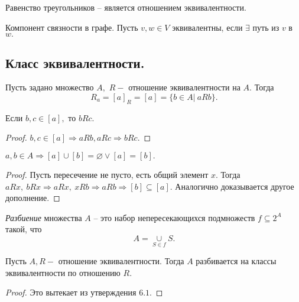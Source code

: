 \begin{example}
    Равенство треугольников -- является отношением эквивалентности.
\end{example}

\begin{example}
    Компонент связности в графе. Пусть $v, w \in V$ эквивалентны, если $\exists$ путь из $v$ в $w.$
\end{example}


\subsection{Класс эквивалентности.}

\begin{definition}
    Пусть задано множество $A,$  $R-$ отношение эквивалентности на $A.$ Тогда 
    $$R_{a} = [a]_{R} = [a] = \{ b \in A | \  a R b\}.$$
\end{definition}

\begin{proposition}
    Если $b, c \in [a],$ то $bRc.$
\end{proposition}

\begin{proof}
$b, c \in [a] \Longrightarrow aRb, aRc \Longrightarrow bRc.$
\end{proof}

\begin{proposition}
    $a, b \in A \Longrightarrow [a] \cup [b] = \varnothing \vee [a] = [b].$
\end{proposition}

\begin{proof}
    Пусть пересечение не пусто, есть общий элемент $x.$ Тогда 
    $aRx, \ bRx \Longrightarrow aRx, \ xRb \Longrightarrow a R b \Longrightarrow [b] \subseteq [a].$
    Аналогично доказывается другое дополнение.
\end{proof}

\begin{definition}
    \textit{Разбиение} множества $A$ -- это набор непересекающихся подмножеств $f \subseteq 2^A$ такой, что 
    $$A = \underset{S \in f}{\cup} S.$$
\end{definition}

\begin{theorem}
    Пусть $A, R-$ отношение эквивалентности. Тогда $A$ разбивается на классы эквивалентности по отношению $R.$
\end{theorem}

\begin{proof}
    Это вытекает из утверждения $6.1.$
\end{proof}

